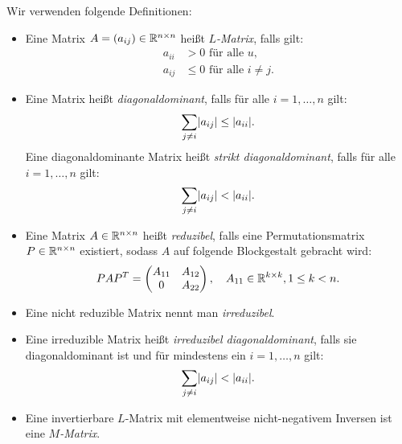 \documentclass{exercise}
\begin{document}
    \begin{problem}
        Wir verwenden folgende Definitionen:
        \begin{itemize}
            \item Eine Matrix \(A = \parentheses*{a_{ij}} \in \R^{n \times n}\) heißt \emph{\(L\)-Matrix}, falls gilt:
            \begin{align*}
                a_{ii} &> 0\text{ für alle }u,\\
                a_{ij} &\le 0\text{ für alle }i \ne j.
            \end{align*}
            \item Eine Matrix heißt \emph{diagonaldominant}, falls für alle \(i = 1, \ldots, n\) gilt:
            \[
                \sum_{j \ne i}\absolute*{a_{ij}} \le \absolute*{a_{ii}}.
            \]
            Eine diagonaldominante Matrix heißt \emph{strikt diagonaldominant}, falls für alle \(i = 1, \ldots, n\) gilt:
            \[
                \sum_{j \ne i}\absolute*{a_{ij}} < \absolute*{a_{ii}}.
            \]
            \item Eine Matrix \(A \in \R^{n \times n}\) heißt \emph{reduzibel}, falls eine Permutationsmatrix \(P \in \R^{n \times n}\) existiert, sodass \(A\) auf folgende Blockgestalt gebracht wird:
            \[
                PAP^T = \begin{pmatrix}
                    A_{11} & A_{12}\\
                    0 & A_{22}
                \end{pmatrix}, \quad A_{11} \in \R^{k \times k}, 1 \le k < n.
            \]
            \item Eine nicht reduzible Matrix nennt man \emph{irreduzibel}.
            \item Eine irreduzible Matrix heißt \emph{irreduzibel diagonaldominant}, falls sie diagonaldominant ist und für mindestens ein \(i = 1, \ldots, n\) gilt:
            \[
                \sum_{j \ne i}\absolute*{a_{ij}} < \absolute*{a_{ii}}.
            \]
            \item Eine invertierbare \(L\)-Matrix mit elementweise nicht-negativem Inversen ist eine \emph{\(M\)-Matrix}.


\end{itemize}
\end{problem}
\end{document}
